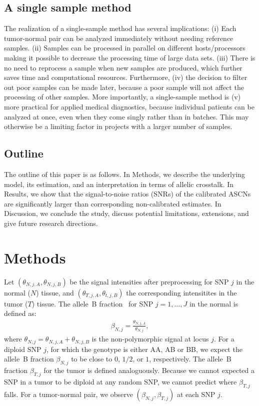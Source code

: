 \documentclass[10pt]{bmc_article}
\newenvironment{bmcformat}{\fussy\setboolean{publ}{true}}{\fussy}
\begin{document}
\begin{bmcformat}
\subsection*{A single sample method}
The realization of a single-sample method has several implications:
(i) Each tumor-normal pair can be analyzed immediately without needing reference samples.
(ii) Samples can be processed in parallel on different hosts/processors making it possible to decrease the processing time of large data sets.
(iii) There is no need to reprocess a sample when new samples are produced, which further saves time and computational resources.
Furthermore, (iv) the decision to filter out poor samples can be made later, because a poor sample will not affect the processing of other samples.
More importantly, a single-sample method is
(v) more practical for applied medical diagnostics, because individual patients can be analyzed at once, even when they come singly rather than in batches.  This may otherwise be a limiting factor in projects with a larger number of samples.

\subsection*{Outline}
The outline of this paper is as follows. 
In Methods, we describe the underlying model, its estimation, and an interpretation in terms of allelic crosstalk. In Results, we show that the signal-to-noise ratios (SNRs) of the calibrated ASCNs are significantly larger than corresponding non-calibrated estimates.
In Discussion, we conclude the study, discuss potential limitations, extensions, and give future research directions.


 
\section*{Methods}
Let $(\theta_{N,j,A}, \theta_{N,j,B})$ be the signal intensities after preprocessing for SNP $j$ in the normal ($N$) tissue, and $(\theta_{T,j,A}, \theta_{t,j,B})$ the corresponding intensitites in the tumor ($T$) tissue. The allele~B fraction~\cite{PeifferD_etal_2006} for SNP $j=1,\ldots,J$ in the normal is defined as:
\begin{eqnarray*}
  \beta_{N,j} = \frac{\theta_{N,j,A}}{\theta_{N,j}},
\end{eqnarray*}
where $\theta_{N,j} = \theta_{N,j,A} + \theta_{N,j,B}$ is the non-polymorphic signal at locus $j$.
For a diploid SNP $j$, for which the genotype is either AA, AB or BB, we expect the allele~B fraction $\beta_{N,j}$ to be close to $0$, $1/2$, or $1$, respectively.
The allele~B fraction $\beta_{T,j}$ for the tumor is defined analoguously. Because we cannot expected a SNP in a tumor to be diploid at any random SNP, we cannot predict where $\beta_{T,j}$ falls. For a tumor-normal pair, we observe $(\beta_{N,j}, \beta_{T,j})$ at each SNP $j$.


\end{bmcformat}
\end{document}
